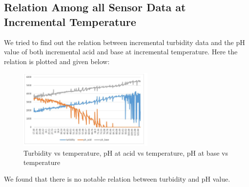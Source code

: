 \subsection{Relation Among all Sensor Data at Incremental Temperature}
We tried to find out the relation between incremental turbidity data and the pH value of both incremental acid and base at incremental temperature.
Here the relation is plotted and given below: 

\begin{figure}[H]
\centering
\includegraphics[width=0.6\textwidth]{figures/temp2combined_data.JPG}
\caption{Turbidity vs temperature, pH at acid vs temperature, pH at base vs temperature}
\label{sample}
\end{figure}
We found that there is no notable relation between turbidity and pH value.


